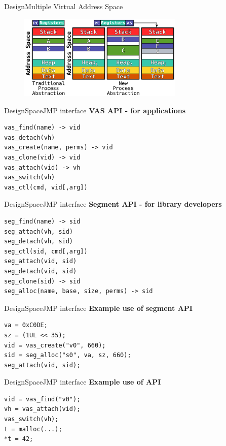 \documentclass[10pt]{beamer}
\begin{document}
\begin{frame}{Design}{Multiple Virtual Address Space}
  \begin{figure}[ht]
    \centering
    \includegraphics[width=0.7\textwidth, keepaspectratio=true]{images/traditional_vs_new_b.png}
  \end{figure}
\end{frame}

\begin{frame}[fragile]{Design}{SpaceJMP interface}
  \textbf{VAS API - for applications}
\begin{lstlisting}
vas_find(name) -> vid
vas_detach(vh)
vas_create(name, perms) -> vid
vas_clone(vid) -> vid
vas_attach(vid) -> vh
vas_switch(vh)
vas_ctl(cmd, vid[,arg])
\end{lstlisting}
\end{frame}

\begin{frame}[fragile]{Design}{SpaceJMP interface}
  \textbf{Segment API - for library developers}
\begin{lstlisting}
seg_find(name) -> sid
seg_attach(vh, sid)
seg_detach(vh, sid)
seg_ctl(sid, cmd[,arg])
seg_attach(vid, sid)
seg_detach(vid, sid)
seg_clone(sid) -> sid
seg_alloc(name, base, size, perms) -> sid
\end{lstlisting}
\end{frame}

\begin{frame}[fragile]{Design}{SpaceJMP interface}
  \textbf{Example use of segment API}
\begin{lstlisting}
va = 0xC0DE;
sz = (1UL << 35);
vid = vas_create("v0", 660);
sid = seg_alloc("s0", va, sz, 660);
seg_attach(vid, sid);
\end{lstlisting}
\end{frame}

\begin{frame}[fragile]{Design}{SpaceJMP interface}
  \textbf{Example use of API}
\begin{lstlisting}
vid = vas_find("v0");
vh = vas_attach(vid);
vas_switch(vh);
t = malloc(...);
*t = 42;
\end{lstlisting}
\end{frame}
\end{document}

